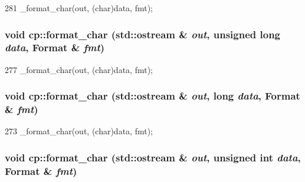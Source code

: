 \begin{DoxyCode}
281 { _format_char(out, (char)data, fmt); }
\end{DoxyCode}
\hypertarget{namespacecp_a21ae8cc02481a788f7e3072f23eacbd2}{
\subsubsection[{format\_\-char}]{\setlength{\rightskip}{0pt plus 5cm}void cp::format\_\-char (std::ostream \& {\em out}, \/  unsigned long {\em data}, \/  Format \& {\em fmt})}}
\label{namespacecp_a21ae8cc02481a788f7e3072f23eacbd2}



\begin{DoxyCode}
277 { _format_char(out, (char)data, fmt); }
\end{DoxyCode}
\hypertarget{namespacecp_a54389ebf91bc95580ab42b9bd57e9fc9}{
\subsubsection[{format\_\-char}]{\setlength{\rightskip}{0pt plus 5cm}void cp::format\_\-char (std::ostream \& {\em out}, \/  long {\em data}, \/  Format \& {\em fmt})}}
\label{namespacecp_a54389ebf91bc95580ab42b9bd57e9fc9}



\begin{DoxyCode}
273 { _format_char(out, (char)data, fmt); }
\end{DoxyCode}
\hypertarget{namespacecp_a7cb425445512ed4efca5c3becf5c4d31}{
\subsubsection[{format\_\-char}]{\setlength{\rightskip}{0pt plus 5cm}void cp::format\_\-char (std::ostream \& {\em out}, \/  unsigned int {\em data}, \/  Format \& {\em fmt})}}
\label{namespacecp_a7cb425445512ed4efca5c3becf5c4d31}



